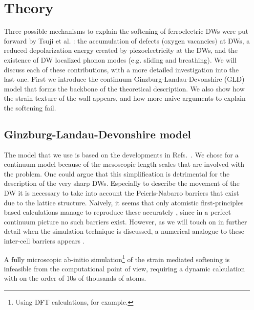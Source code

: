 \section{Theory}
Three possible mechanisms to explain the softening of ferroelectric DWs were put forward by Tsuji et al. \cite{Tsuji2005}: the accumulation of defects (oxygen vacancies) at DWs, a reduced depolarization energy created by piezoelectricity at the DWs, and the existence of DW localized phonon modes (e.g. sliding and breathing). We will discuss each of these contributions, with a more detailed investigation into the last one.
First we introduce the continuum Ginzburg-Landau-Devonshire (GLD) model that forms the backbone of the theoretical description.
We also show how the strain texture of the wall appears, and how more naive arguments to explain the softening fail.

\subsection{Ginzburg-Landau-Devonshire model}
The model that we use is based on the developments in Refs.~\cite{Zhirnov1959,L.N.Bulaevskii1963,Marton2010}.
We chose for a continuum model because of the mesoscopic length scales that are involved with the problem.
One could argue that this simplification is detrimental for the description of the very sharp DWs.
Especially to describe the movement of the DW it is necessary to take into account the Peierls-Nabarro  barriers that exist due to the lattice structure.
Naively, it seems that only atomistic first-principles based calculations manage to reproduce these accurately \cite{Meyer2002}, since in a perfect continuum picture no such barriers exist.
However, as we will touch on in further detail when the simulation technique is discussed, a numerical analogue to these inter-cell barriers appears \cite{Marton2018}.

A fully microscopic ab-initio simulation\footnote{Using DFT calculations, for example.} of the strain mediated softening is infeasible from the computational point of view, requiring a dynamic calculation with on the order of 10s of thousands of atoms.

